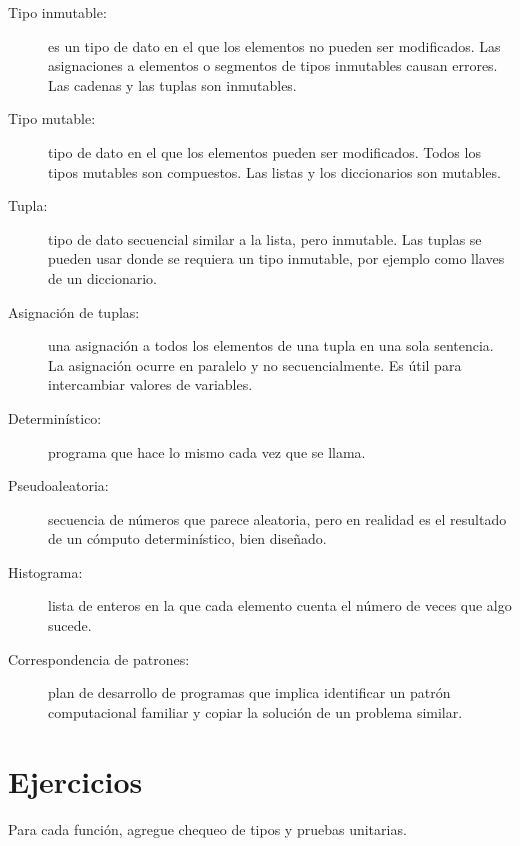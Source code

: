 \begin{description}

\item[Tipo inmutable:] es un tipo de dato en el que los elementos no
pueden ser modificados. Las asignaciones a elementos o segmentos
de tipos inmutables causan errores. Las cadenas y las tuplas son
inmutables.

\item[Tipo mutable:] tipo de dato en el que los elementos 
pueden ser modificados. Todos los tipos mutables son compuestos.
Las listas y los diccionarios son mutables.

\item[Tupla:] tipo de dato secuencial similar a la lista, pero 
inmutable.  Las tuplas se pueden usar donde se requiera un tipo inmutable,
por ejemplo como llaves de un diccionario.

\item[Asignación de tuplas:] una asignación a todos los elementos de una tupla
en una sola sentencia. La asignación ocurre en paralelo y no secuencialmente.
Es útil para intercambiar valores de variables.

\item[Determinístico:] programa que hace lo mismo cada vez que se llama.

\item[Pseudoaleatoria:] secuencia de números que parece aleatoria, pero
en realidad es el resultado de un cómputo determinístico, bien diseñado.

\item[Histograma:]  lista de enteros en la que cada elemento cuenta
el número de veces que algo sucede.

\item[Correspondencia de patrones:] plan de desarrollo de programas que
implica identificar un patrón computacional familiar y copiar la 
solución de un problema similar.


\end{description}

\section{Ejercicios}


Para cada función, agregue chequeo de tipos y pruebas unitarias.



